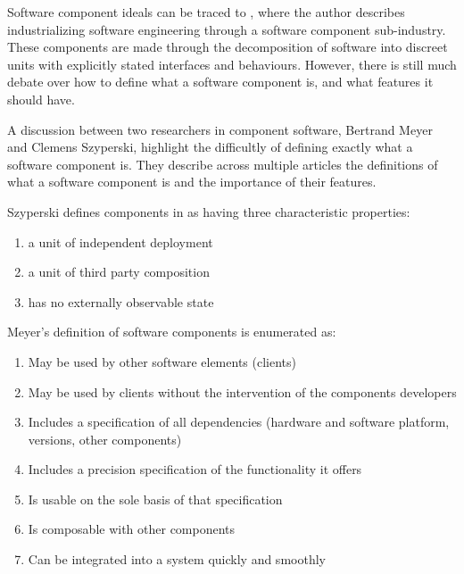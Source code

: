 Software component ideals can be traced to \citep{McIlroy1969}, where the author describes industrializing software engineering through a software component sub-industry.
These components are made through the decomposition of software into discreet units with explicitly stated interfaces and behaviours.
However, there is still much debate over how to define what a software component is, and what features it should have.

A discussion between two researchers in component software, Bertrand Meyer and Clemens Szyperski, highlight the difficultly of defining exactly what a software component is. 
They describe across multiple articles \citep{Meyer1999,Szyperski2000a, Szyperski2000, Meyer2000} the definitions of what a software component is and the importance of their features.

Szyperski defines components in \citep{Szyperski2002} as having three characteristic properties:
\begin{enumerate}
  \item a unit of independent deployment
  \item a unit of third party composition
  \item has no externally observable state
\end{enumerate}

Meyer's definition of software components is enumerated as:
\begin{enumerate}
  \item May be used by other software elements (clients)
  \item May be used by clients without the intervention of the components developers
  \item Includes a specification of all dependencies (hardware and software platform, versions, other components)
  \item Includes a precision specification of the functionality it offers
  \item Is usable on the sole basis of that specification
  \item Is composable with other components
  \item Can be integrated into a system quickly and smoothly
\end{enumerate}

